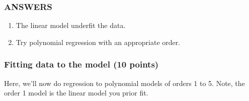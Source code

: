 \documentclass[11pt]{article}
\begin{document}
    \hypertarget{answers}{%
\subsubsection{ANSWERS}\label{answers}}

\begin{enumerate}
\def\labelenumi{(\arabic{enumi})}
\item
  The linear model underfit the data.
\item
  Try polynomial regression with an appropriate order.
\end{enumerate}

    \hypertarget{fitting-data-to-the-model-10-points}{%
\subsubsection{Fitting data to the model (10
points)}\label{fitting-data-to-the-model-10-points}}

Here, we'll now do regression to polynomial models of orders 1 to 5.
Note, the order 1 model is the linear model you prior fit.
\end{document}
